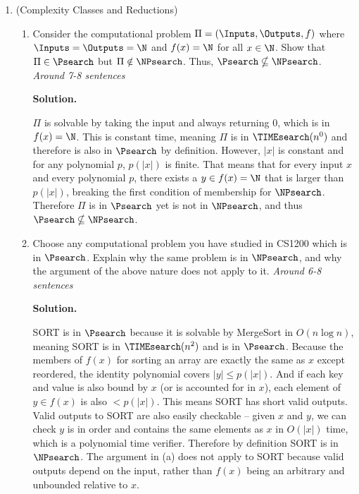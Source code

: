 \documentclass[11pt]{article}
\newenvironment{soln}{%
  \par\medskip\noindent\begingroup\color{blue}\textbf{Solution.}\ %
}{%
  \endgroup\par\medskip%
}
\begin{document}
\begin{enumerate}
    \item (Complexity Classes and Reductions)
    \begin{enumerate}
        \item 
        Consider the computational problem $\Pi = (\Inputs,\Outputs,f)$ where $\Inputs=\Outputs=\N$ and $f(x)=\N$ for all $x\in \N$.  Show that $\Pi\in \Psearch$ but $\Pi\notin \NPsearch$.  Thus, $\Psearch\nsubseteq\NPsearch$. \textit{Around 7-8 sentences}

\begin{soln}
$\Pi$ is solvable by taking the input and always returning $0$, which is in $f(x)=\N$. This is constant time, meaning $\Pi$ is in $\TIMEsearch(n^0)$ and therefore is also in $\Psearch$ by definition. However, $|x|$ is constant and for any polynomial $p$, $p(|x|)$ is finite. That means that for every input $x$ and every polynomial $p$, there exists a $y\in f(x)=\N$ that is larger than $p(|x|)$, breaking the first condition of membership for $\NPsearch$. Therefore $\Pi$ is in $\Psearch$ yet is not in $\NPsearch$, and thus $\Psearch\nsubseteq\NPsearch$.
\end{soln}

\item  Choose any computational problem you have studied in CS1200 which is in $\Psearch$. Explain why the same problem is in $\NPsearch$, and why the argument of the above nature does not apply to it. \textit{Around 6-8 sentences}

\begin{soln}
 SORT is in $\Psearch$ because it is solvable by MergeSort in $O(n \log n)$, meaning SORT is in $\TIMEsearch(n^2)$ and is in $\Psearch$. Because the members of $f(x)$ for sorting an array are exactly the same as $x$ except reordered, the identity polynomial covers $|y|\leq p(|x|)$. And if each key and value is also bound by $x$ (or is accounted for in $x$), each element of $y\in f(x)$ is also $<p(|x|)$. This means SORT has short valid outputs. Valid outputs to SORT are also easily checkable -- given $x$ and $y$, we can check $y$ is in order and contains the same elements as $x$ in $O(|x|)$ time, which is a polynomial time verifier. Therefore by definition SORT is in $\NPsearch$. The argument in (a) does not apply to SORT because valid outputs depend on the input, rather than $f(x)$ being an arbitrary and unbounded relative to $x$.
\end{soln}

\end{enumerate}


\end{enumerate}
\end{document}
